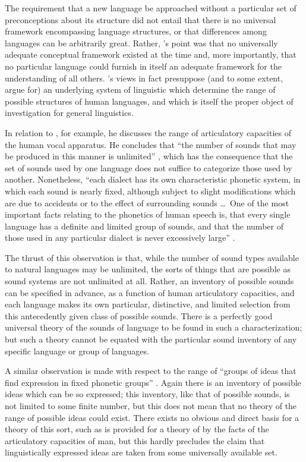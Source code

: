 The requirement that a new language be approached without a particular
set of preconceptions about its structure did not entail that there is
no universal framework encompassing language structures, or that
differences among languages can be arbitrarily great. Rather, {\Boas}'s
point was that no universally adequate conceptual framework existed at
the time and, more importantly, that no particular language could
furnish in itself an adequate framework for the understanding of all
others. {\Boas}'s views in fact presuppose (and to some extent, argue
for) an underlying system of linguistic  which determine the
range of possible structures of human languages, and which is itself
the proper object of investigation for general linguistics.

In relation to , for example, he discusses the range of
articulatory capacities of the human vocal apparatus. He concludes
that ``the number of sounds that may be produced in this manner is
unlimited'' \citep[15]{boas11:introduction}, which has the consequence
that the set of sounds used by one language does not suffice to
categorize those used by another. Nonetheless, ``each dialect has its
own characteristic phonetic system, in which each sound is nearly
fixed, although subject to slight modifications which are due to
accidents or to the effect of surrounding sounds \ldots\ One of the
most important facts relating to the phonetics of human speech is,
that every single language has a definite and limited group of sounds,
and that the number of those used in any particular dialect is never
excessively large'' \citep[16]{boas11:introduction}.

The thrust of this observation is that, while the number of sound
types available to natural languages may be unlimited, the sorts of
things that are possible as sound systems are not unlimited at
all. Rather, an inventory of possible sounds can be specified in
advance, as a function of human articulatory capacities, and each
language makes its own particular, distinctive, and limited selection
from this antecedently given class of possible sounds. There is a
perfectly good universal theory of the sounds of language to be found
in such a characterization; but such a theory cannot be equated with
the particular sound inventory of any specific language or group of
languages.

A similar observation is made with respect to the range of ``groups of
ideas that find expression in fixed phonetic
groups'' \citep[24]{boas11:introduction}. Again there is an inventory of
possible ideas which can be so expressed; this inventory, like that of
possible sounds, is not limited to some finite number, but this does
not mean that no theory of the range of possible ideas could
exist. There exists no obvious and direct basis for a theory of this
sort, such as is provided for a theory of  by the facts
of the articulatory capacities of man, but this hardly precludes the
claim that linguistically expressed ideas are taken from some
universally available set.

